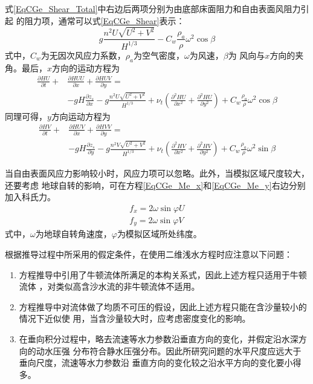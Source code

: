 式\eqref{EqCGe_Shear_Total}中右边后两项分别为由底部床面阻力和自由表面风阻力引起
的阻力项，通常可以式\eqref{EqCGe_Shear}表示：
\begin{equation}
  g\frac{n^{2}U\sqrt{U^{2}+V^{2}}}{H^{1/3}}
  -
  C_{w}\frac{\rho_{a}}{\rho}\omega^{2}\cos\beta
  \label{EqCGe_Shear}
\end{equation}
式中，$C_{w}$为无因次风应力系数，$\rho_{a}$为空气密度，$\omega$为风速，$\beta$为
风向与$x$方向的夹角。最后，$x$方向的运动方程为
\begin{equation}
  \begin{aligned}
    \frac{\partial HU}{\partial t} +
    &\frac{\partial HUU}{\partial x} +
    \frac{\partial HUV}{\partial y}
    =\\
    &-gH\frac{\partial  z_{s}}{\partial x}
    -g\frac{n^{2}U\sqrt{U^{2}+V^{2}}}{H^{1/3}}
    +
    \nu_{t}\left(
    \frac{\partial^{2}HU}{\partial x^{2}}+
    \frac{\partial^{2}HU}{\partial y^{2}}
    \right)
    +C_{w}\frac{\rho_{a}}{\rho}\omega^{2}\cos\beta
  \end{aligned}
  \label{EqCGe_Me_x}
\end{equation}
同理可得，$y$方向运动方程为
\begin{equation}
  \begin{aligned}
    \frac{\partial HV}{\partial t} +
    &\frac{\partial HUV}{\partial x} +
    \frac{\partial HVV}{\partial y}
    =\\
    &-gH\frac{\partial  z_{s}}{\partial y}
    -g\frac{n^{2}V\sqrt{U^{2}+V^{2}}}{H^{1/3}}
    +
    \nu_{t}\left(
    \frac{\partial^{2}HV}{\partial x^{2}}+
    \frac{\partial^{2}HV}{\partial y^{2}}
    \right)
    +C_{w}\frac{\rho_{a}}{\rho}\omega^{2}\sin\beta
  \end{aligned}
  \label{EqCGe_Me_y}
\end{equation}

当自由表面风应力影响较小时，风应力项可以忽略。此外，当模拟区域尺度较大，还要考虑
地球自转的影响，可在方程\eqref{EqCGe_Me_x}和\eqref{EqCGe_Me_y}右边分别加入科氏力。
\begin{equation}
  \begin{aligned}
    f_x = 2\omega\sin\varphi U
    \\
    f_y = 2\omega\sin\varphi V
  \end{aligned}
\end{equation}
式中，$\omega$为地球自转角速度，$\varphi$为模拟区域所处纬度。

根据推导过程中所采用的假定条件，在使用二维浅水方程时应注意以下问题：
\begin{enumerate}
  \item 方程推导中引用了牛顿流体所满足的本构关系式，因此上述方程只适用于牛顿流体
    ，对类似高含沙水流的非牛顿流体不适用。
  \item 方程推导中对流体做了均质不可压的假设，因此上述方程只能在含沙量较小的情况下近似使
    用，当含沙量较大时，应考虑密度变化的影响。
  \item 在垂向积分过程中，略去流速等水力参数沿垂直方向的变化，并假定沿水深方向的动水压强
    分布符合静水压强分布。因此所研究问题的水平尺度应远大于垂向尺度，流速等水力参数沿
    垂直方向的变化较之沿水平方向的变化要小得多。
\end{enumerate}

